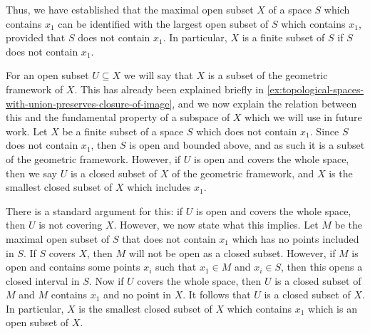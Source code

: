\documentclass[a4paper,reqno,oneside]{article}
\begin{document}
\medskip

Thus, we have established that the maximal open subset $X$ of a space $S$ which contains $x_1$ can be identified with the largest open subset of $S$ which contains $x_1$, provided that $S$ does not contain $x_1$. In particular, $X$ is a finite subset of $S$ if $S$ does not contain $x_1$.

%
\begin{example}
For an open subset $U \subseteq X$ we will say that $X$ is a subset of the geometric framework of $X$. This has already been explained briefly in \cref{ex:topological-spaces-with-union-preserves-closure-of-image}, and we now explain the relation between this and the fundamental property of a subspace of $X$ which we will use in future work. Let $X$ be a finite subset of a space $S$ which does not contain $x_1$. Since $S$ does not contain $x_1$, then $S$ is open and bounded above, and as such it is a subset of the geometric framework. However, if $U$ is open and covers the whole space, then we say $U$ is a closed subset of $X$ of the geometric framework, and $X$ is the smallest closed subset of $X$ which includes $x_1$.

    \medskip
    
    There is a standard argument for this: if $U$ is open and covers the whole space, then $U$ is not covering $X$. However, we now state what this implies. Let $M$ be the maximal open subset of $S$ that does not contain $x_1$ which has no points included in $S$. If $S$ covers $X$, then $M$ will not be open as a closed subset. However, if $M$ is open and contains some points $x_i$ such that $x_1 \in M$ and $x_i \in S$, then this opens a closed interval in $S$. Now if $U$ covers the whole space, then $U$ is a closed subset of $M$ and $M$ contains $x_1$ and no point in $X$. It follows that $U$ is a closed subset of $X$. In particular, $X$ is the smallest closed subset of $X$ which contains $x_1$ which is an open subset of $X$.
\end{example}
\end{document}
